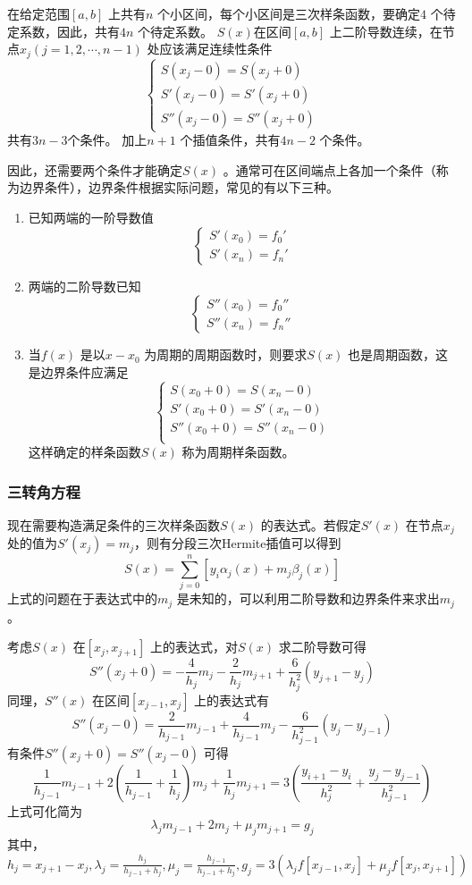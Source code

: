 \documentclass[a4paper]{article}
\begin{document}
在给定范围$[a,b]$ 上共有$n$ 个小区间，每个小区间是三次样条函数，要确定$4$ 个待定系数，因此，共有$4n$ 个待定系数。
$S(x)$在区间$[a,b]$ 上二阶导数连续，在节点$x_{j}(j=1,2,\cdots,n-1)$ 处应该满足连续性条件
\[
\begin{cases}
	S(x_{j}-0) = S(x_{j}+0) \\
	S'(x_{j}-0) = S'(x_{j}+0) \\
	S''(x_{j}-0) = S''(x_{j}+0)
\end{cases}
\] 
共有$3n-3$个条件。
加上$n+1$ 个插值条件，共有$4n-2$ 个条件。

因此，还需要两个条件才能确定$S(x)$ 。通常可在区间端点上各加一个条件（称为边界条件），边界条件根据实际问题，常见的有以下三种。
\begin{enumerate}
	\item 已知两端的一阶导数值
		\[
			\tag{1.7.1} \label{eq:1.7.1}
			\begin{cases}
				S'(x_0) = f_0' \\
				S'(x_{n}) = f_n'
			\end{cases}
		\] 
	\item 两端的二阶导数已知
		\[
			\tag{1.7.2} \label{eq:1.7.2}
			\begin{cases} 
				S''(x_0) = f_0'' \\
				S''(x_{n}) = f_n''
			\end{cases}
		\] 
	\item 当$f(x)$ 是以$x-x_0$ 为周期的周期函数时，则要求$S(x)$ 也是周期函数，这是边界条件应满足
		\[
			\tag{1.7.3} \label{eq:1.7.3}
    			\begin{cases}
    				S(x_0 + 0) = S(x_{n} - 0) \\
    				S'(x_0 + 0) = S'(x_{n} - 0) \\
    				S''(x_0 + 0) = S''(x_{n} - 0) \\
    			\end{cases}
		\] 
		这样确定的样条函数$S(x)$ 称为周期样条函数。
\end{enumerate}
\subsubsection{三转角方程}
现在需要构造满足条件的三次样条函数$S(x)$ 的表达式。若假定$S'(x)$ 在节点$x_{j}$ 处的值为$S'(x_{j}) = m_j$，则有分段三次Hermite插值可以得到
\[
	S(x) = \sum_{j=0}^{n} [y_{i} \alpha_j(x) + m_j \beta_j(x)]
\] 
上式的问题在于表达式中的$m_j$ 是未知的，可以利用二阶导数和边界条件来求出$m_{j}$。

考虑$S(x)$ 在$[x_{j}, x_{j+1}]$ 上的表达式，对$S(x)$ 求二阶导数可得
\[
S''(x_{j}+0) = - \frac{4}{h_j}m_j - \frac{2}{h_j} m_{j+1} + \frac{6}{h^2_j}(y_{j+1} - y_{j})
\] 
同理，$S''(x)$ 在区间$[x_{j-1}, x_{j}]$ 上的表达式有
\[
	S''(x_{j} - 0) = \frac{2}{h_{j-1}} m_{j-1} + \frac{4}{h_{j-1}} m_j - \frac{6}{h^2_{j-1}} (y_{j} - y_{j-1})
\] 
有条件$S''(x_{j}+0) = S''(x_{j}-0)$ 可得
\[
	\frac{1}{h_{j-1}} m_{j-1} + 2 \left( \frac{1}{h_{j-1}} + \frac{1}{h_j} \right) m_j + \frac{1}{h_j} m_{j+1} = 3 \left( \frac{y_{i+1} - y_{i}}{h^2_j} + \frac{y_{j} - y_{j-1}}{h^2_{j-1}} \right) 
\] 
上式可化简为
\[
	\lambda_j m_{j-1} + 2 m_j  + \mu_j m_{j+1} = g_j
\] 
其中，$h_j = x_{j+1} - x_{j}, \lambda_j = \frac{h_j}{h_{j-1} + h_j}, \mu_j = \frac{h_{j-1}}{h_{j-1} + h_j}, g_j = 3 (\lambda_j f[x_{j-1}, x_{j}] + \mu_j f[x_{j}, x_{j+1}])$
\end{document}
